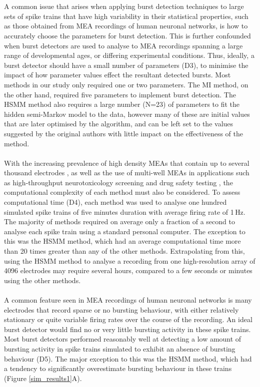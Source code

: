\documentclass[12pt, titlepage]{article}
\begin{document}
	\\ \\ A common issue that arises when applying burst detection techniques to large sets of spike trains that have high variability in their statistical properties, such as those obtained from MEA recordings of human neuronal networks, is how to accurately choose the parameters for burst detection. This is further confounded when burst detectors are used to analyse to MEA recordings spanning a large range of developmental ages, or differing experimental conditions. Thus, ideally, a burst detector should have a small number of parameters (D3), to minimise the impact of how parameter values effect the resultant detected bursts. Most methods in our study only required one or two parameters. The MI method, on the other hand, required five parameters to implement burst detection. The HSMM method also requires a large number (N=23) of parameters to fit the hidden semi-Markov model to the data, however many of these are initial values that are later optimised by the algorithm, and can be left set to the values suggested by the original authors with little impact on the effectiveness of the method. 
	\\ \\ With the increasing prevalence of high density MEAs that contain up to several thousand electrodes \cite{Maccione2014}, as well as the use of multi-well MEAs in applications such as high-throughput neurotoxicology screening \cite{Valdivia2014,Nicolas2014} and drug safety testing \cite{Gilchrist2015}, the computational complexity of each method must also be considered. To assess computational time (D4), each method was used to analyse one hundred simulated spike trains of five minutes duration with average firing rate of 1$\,$Hz. The majority of methods required on average only a fraction of a second to analyse each spike train using a standard personal computer. The exception to this was the HSMM method, which had an average computational time more than 20 times greater than any of the other methods. Extrapolating from this, using the HSMM method to analyse a recording from one high-resolution array of 4096 electrodes may require several hours, compared to a few seconds or minutes using the other methods.
	\\ \\ A common feature seen in MEA recordings of human neuronal networks is many electrodes that record sparse or no bursting behaviour, with either relatively stationary or quite variable firing rates over the course of the recording. An ideal burst detector would find no or very little bursting activity in these spike trains. Most burst detectors performed reasonably well at detecting a low amount of bursting activity in spike trains simulated to exhibit an absence of bursting behaviour (D5). The major exception to this was the HSMM method, which had a tendency to significantly overestimate bursting behaviour in these trains (Figure \ref{sim_results1}A). 
\end{document}
